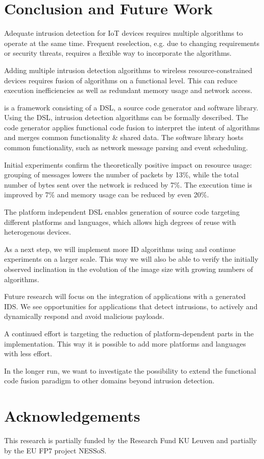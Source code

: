 \documentclass[3p,times,procedia]{elsarticle}
\begin{document}
\section{Conclusion and Future Work}
\label{conclusion}

Adequate intrusion detection for IoT devices requires multiple algorithms to
operate at the same time. Frequent reselection, e.g. due to changing
requirements or security threats, requires a flexible way to incorporate the
algorithms.

Adding multiple intrusion detection algorithms to wireless resource-constrained
devices requires fusion of algorithms on a functional level. This can reduce
execution inefficiencies as well as redundant memory usage and network access.

\NAME is a framework consisting of a DSL, a source code generator and software
library. Using the DSL, intrusion detection algorithms can be formally
described. The code generator applies functional code fusion to interpret the
intent of algorithms and merges common functionality \& shared data. The
software library hosts common functionality, such as network message parsing
and event scheduling.

Initial experiments confirm the theoretically positive impact on resource
usage: grouping of messages lowers the number of packets by 13\%, while the
total number of bytes sent over the network is reduced by 7\%. The execution
time is improved by 7\% and memory usage can be reduced by even 20\%.

The platform independent DSL enables generation of source code targeting
different platforms and languages, which allows high degrees of reuse with
heterogenous devices.

As a next step, we will implement more ID algorithms using \NAME and continue
experiments on a larger scale. This way we will also be able to verify the
initially observed inclination in the evolution of the image size with growing
numbers of algorithms.

Future research will focus on the integration of applications with a generated
IDS. We see opportunities for applications that detect intrusions, to actively
and dynamically respond and avoid malicious payloads.

A continued effort is targeting the reduction of platform-dependent parts in
the implementation. This way it is possible to add more platforms and languages
with less effort.

In the longer run, we want to investigate the possibility to extend the
functional code fusion paradigm to other domains beyond intrusion detection.

\section{Acknowledgements}

This research is partially funded by the Research Fund KU Leuven and partially
by the EU FP7 project NESSoS\@.



\end{document}
